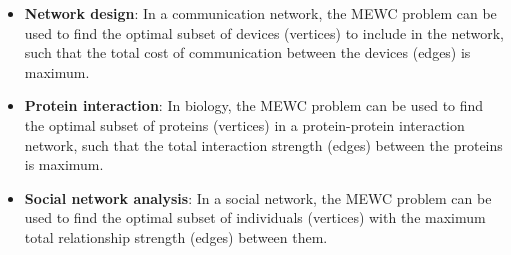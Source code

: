 \begin{itemize}
    \item \textbf{Network design}: In a communication network, the MEWC problem
          can be used to find the optimal subset of devices (vertices) to include in
          the network, such that the total cost of communication between the devices
          (edges) is maximum.
    \item \textbf{Protein interaction}: In biology, the MEWC problem can be used
          to find the optimal subset of proteins (vertices) in a protein-protein
          interaction network, such that the total interaction strength (edges)
          between the proteins is maximum.
    \item \textbf{Social network analysis}: In a social network, the MEWC problem
          can be used to find the optimal subset of individuals (vertices) with
          the maximum total relationship strength (edges) between them.
\end{itemize}